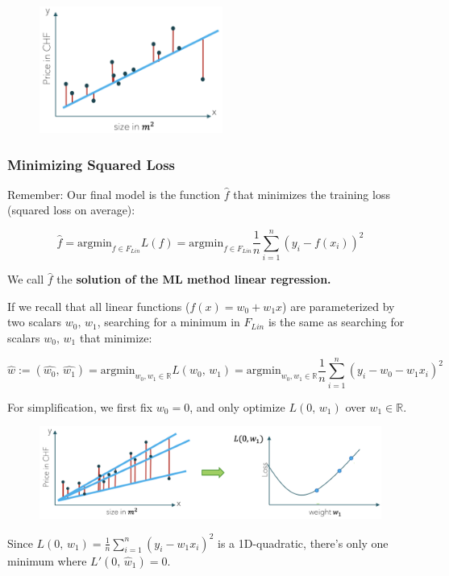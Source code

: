 \documentclass[a4paper]{extarticle}
\begin{document}
\begin{figure}[H]
	\includegraphics[width = 6cm]{../images/IntroML_Fig1-5}
	\centering
\end{figure}

\subsubsection{Minimizing Squared Loss}

Remember: Our final model is the function \(\hat{f}\) that minimizes the training loss (squared loss on average):

\[
	\hat{f} = \text{argmin}_{f \in F_{Lin}} L(f) = \text{argmin}_{f \in F_{Lin}} \frac{1}{n} \sum_{i = 1}^n (y_i - f(x_i))^2
\]

We call \(\hat{f}\) the \textbf{solution of the ML method linear regression.}

If we recall that all linear functions (\(f(x) = w_0 + w_1x\)) are parameterized by two scalars \(w_0, \, w_1\), searching for a minimum in \(F_{Lin}\) is the same as searching for scalars \(w_0, \, w_1\) that minimize:

\[
	\hat{w} := (\hat{w_0}, \, \hat{w_1}) = \text{argmin}_{w_0,w_1 \in \mathbb{R}} L(w_0, \, w_1) = \text{argmin}_{w_0,w_1 \in \mathbb{R}} \frac{1}{n} \sum_{i = 1}^n (y_i - w_0 - w_1x_i)^2
\]

For simplification, we first fix \(w_0 = 0\), and only optimize \(L(0, \, w_1)\) over \(w_1 \in \mathbb{R}\).

\begin{figure}[H]
	\includegraphics[width = 15cm]{../images/IntroML_Fig1-6}
	\centering
\end{figure}

Since \(L(0, \, w_1) = \frac{1}{n} \sum_{i = 1}^n (y_i - w_1x_i)^2\) is a 1D-quadratic, there's only one minimum where \(L'(0, \, \hat{w}_1) = 0\).
\end{document}
